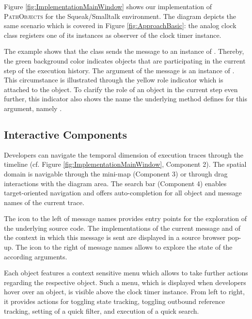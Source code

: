 Figure \ref{fig:ImplementationMainWindow} shows our implementation of \textsc{PathObjects} for the Squeak/Smalltalk environment.
The diagram depicts the same scenario which is covered in Figure \ref{fig:ApproachBasic}:
the analog clock class registers one of its instances as observer of the clock timer instance.

The example shows that the class  sends the  message to an instance of .
Thereby, the green background color indicates objects that are participating in the current step of the execution history.
The argument of the  message is an instance of .
This circumstance is illustrated through the yellow role indicator which is attached to the object.
To clarify the role of an object in the current step even further, this indicator also shows the name the underlying method defines for this argument, namely .

\subsection{Interactive Components}
Developers can navigate the temporal dimension of execution traces through the timeline (cf. Figure \ref{fig:ImplementationMainWindow}, Component 2).
The spatial domain is navigable through the mini-map (Component 3) or through drag interactions with the diagram area.
The search bar (Component 4) enables target-oriented navigation and offers auto-completion for all object and message names of the current trace.

The icon to the left of message names provides entry points for the exploration of the underlying source code.
The implementations of the current message and of the context in which this message is sent are displayed in a source browser pop-up.
The icon to the right of message names allows to explore the state of the according arguments.

Each object features a context sensitive menu which allows to take further actions regarding the respective object.
Such a menu, which is displayed when developers hover over an object, is visible above the clock timer instance.
From left to right, it provides actions for toggling state tracking, toggling outbound reference tracking, setting of a quick filter, and execution of a quick search.

